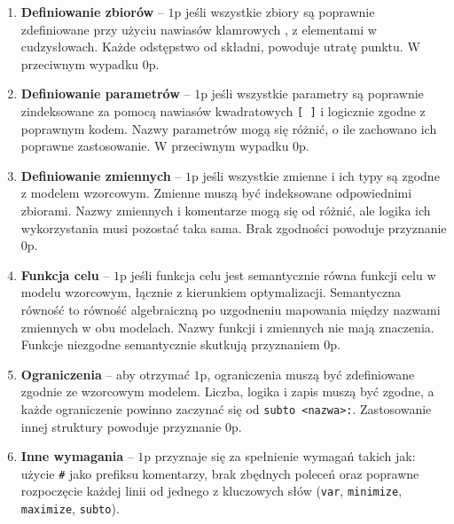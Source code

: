 \begin{enumerate}
\item \textbf{Definiowanie zbiorów} -- $1$p jeśli wszystkie zbiory są poprawnie zdefiniowane przy użyciu nawiasów klamrowych \texttt{{}}, z elementami w cudzysłowach. %
 Każde odstępstwo od składni, powoduje utratę punktu. %
 W przeciwnym wypadku $0$p.
\item \textbf{Definiowanie parametrów} -- $1$p jeśli wszystkie parametry są poprawnie zindeksowane za pomocą nawiasów kwadratowych \texttt{[ ]} %
i logicznie zgodne z poprawnym kodem. %
Nazwy parametrów mogą się różnić, o ile zachowano ich poprawne zastosowanie. W przeciwnym wypadku $0$p.
\item \textbf{Definiowanie zmiennych} -- $1$p jeśli wszystkie zmienne i ich typy %
są zgodne z modelem wzorcowym. Zmienne muszą być indeksowane odpowiednimi zbiorami. Nazwy zmiennych i komentarze mogą się od różnić, ale logika ich wykorzystania musi pozostać taka sama. Brak zgodności powoduje przyznanie $0$p.
\item \textbf{Funkcja celu} -- $1$p jeśli funkcja celu jest semantycznie równa funkcji celu w modelu wzorcowym, łącznie z kierunkiem optymalizacji. Semantyczna równość to równość algebraiczną po uzgodneniu mapowania między nazwami zmiennych w obu modelach. Nazwy funkcji i zmiennych nie mają znaczenia. Funkcje niezgodne semantycznie skutkują przyznaniem $0$p.
\item \textbf{Ograniczenia} -- aby otrzymać $1$p, ograniczenia muszą być zdefiniowane zgodnie ze wzorcowym modelem. Liczba, logika i zapis muszą być zgodne, a każde ograniczenie powinno zaczynać się od \texttt{subto <nazwa>:}. Zastosowanie innej struktury powoduje przyznanie $0$p.
\item \textbf{Inne wymagania} -- $1$p przyznaje się za spełnienie wymagań takich jak: użycie \texttt{\#} jako prefiksu komentarzy, brak zbędnych poleceń oraz poprawne rozpoczęcie każdej linii od jednego z kluczowych słów (\texttt{var}, \texttt{minimize}, \texttt{maximize}, \texttt{subto}). %
\end{enumerate}

